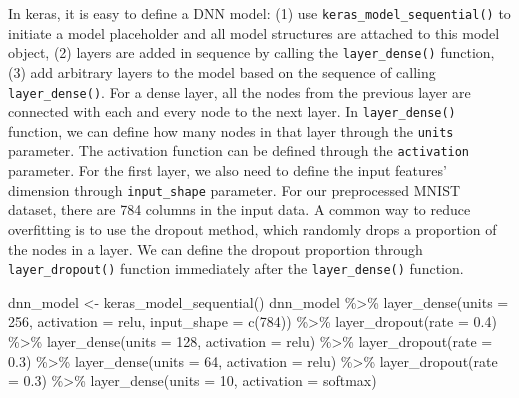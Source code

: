 \documentclass[
  12pt,
]{krantz}
\makeatletter
\newenvironment{Shaded}{\begin{snugshade}}{\end{snugshade}}
\newcommand{\AttributeTok}[1]{\textcolor[rgb]{0.61,0.61,0.61}{#1}}
\newcommand{\DecValTok}[1]{\textcolor[rgb]{0.06,0.06,0.06}{#1}}
\newcommand{\FloatTok}[1]{\textcolor[rgb]{0.06,0.06,0.06}{#1}}
\newcommand{\FunctionTok}[1]{\textcolor[rgb]{0,0,0}{#1}}
\newcommand{\NormalTok}[1]{#1}
\newcommand{\OtherTok}[1]{\textcolor[rgb]{0.37,0.37,0.37}{#1}}
\newcommand{\SpecialCharTok}[1]{\textcolor[rgb]{0,0,0}{#1}}
\newcommand{\StringTok}[1]{\textcolor[rgb]{0.5,0.5,0.5}{#1}}
\newenvironment{kframe}{%
\medskip{}
\setlength{\fboxsep}{.8em}
 \def\at@end@of@kframe{}%
 \ifinner\ifhmode%
  \def\at@end@of@kframe{\end{minipage}}%
  \begin{minipage}{\columnwidth}%
 \fi\fi%
 \def\FrameCommand##1{\hskip\@totalleftmargin \hskip-\fboxsep
 \colorbox{shadecolor}{##1}\hskip-\fboxsep
     \hskip-\linewidth \hskip-\@totalleftmargin \hskip\columnwidth}%
 \MakeFramed {\advance\hsize-\width
   \@totalleftmargin\z@ \linewidth\hsize
   \@setminipage}}%
 {\par\unskip\endMakeFramed%
 \at@end@of@kframe}
\renewenvironment{Shaded}{\begin{kframe}}{\end{kframe}}
\makeatother
\begin{document}
In keras, it is easy to define a DNN model: (1) use \texttt{keras\_model\_sequential()} to initiate a model placeholder and all model structures are attached to this model object, (2) layers are added in sequence by calling the \texttt{layer\_dense()} function, (3) add arbitrary layers to the model based on the sequence of calling \texttt{layer\_dense()}. For a dense layer, all the nodes from the previous layer are connected with each and every node to the next layer. In \texttt{layer\_dense()} function, we can define how many nodes in that layer through the \texttt{units} parameter. The activation function can be defined through the \texttt{activation} parameter. For the first layer, we also need to define the input features' dimension through \texttt{input\_shape} parameter. For our preprocessed MNIST dataset, there are 784 columns in the input data. A common way to reduce overfitting is to use the dropout method, which randomly drops a proportion of the nodes in a layer. We can define the dropout proportion through \texttt{layer\_dropout()} function immediately after the \texttt{layer\_dense()} function.

\begin{Shaded}
\begin{Highlighting}[]
\NormalTok{dnn\_model }\OtherTok{\textless{}{-}} \FunctionTok{keras\_model\_sequential}\NormalTok{()}
\NormalTok{dnn\_model }\SpecialCharTok{\%\textgreater{}\%}
  \FunctionTok{layer\_dense}\NormalTok{(}\AttributeTok{units =} \DecValTok{256}\NormalTok{, }\AttributeTok{activation =} \StringTok{\textquotesingle{}relu\textquotesingle{}}\NormalTok{, }\AttributeTok{input\_shape =} \FunctionTok{c}\NormalTok{(}\DecValTok{784}\NormalTok{)) }\SpecialCharTok{\%\textgreater{}\%}
  \FunctionTok{layer\_dropout}\NormalTok{(}\AttributeTok{rate =} \FloatTok{0.4}\NormalTok{) }\SpecialCharTok{\%\textgreater{}\%}
  \FunctionTok{layer\_dense}\NormalTok{(}\AttributeTok{units =} \DecValTok{128}\NormalTok{, }\AttributeTok{activation =} \StringTok{\textquotesingle{}relu\textquotesingle{}}\NormalTok{) }\SpecialCharTok{\%\textgreater{}\%}
  \FunctionTok{layer\_dropout}\NormalTok{(}\AttributeTok{rate =} \FloatTok{0.3}\NormalTok{) }\SpecialCharTok{\%\textgreater{}\%}
  \FunctionTok{layer\_dense}\NormalTok{(}\AttributeTok{units =} \DecValTok{64}\NormalTok{, }\AttributeTok{activation =} \StringTok{\textquotesingle{}relu\textquotesingle{}}\NormalTok{) }\SpecialCharTok{\%\textgreater{}\%}
  \FunctionTok{layer\_dropout}\NormalTok{(}\AttributeTok{rate =} \FloatTok{0.3}\NormalTok{) }\SpecialCharTok{\%\textgreater{}\%}
  \FunctionTok{layer\_dense}\NormalTok{(}\AttributeTok{units =} \DecValTok{10}\NormalTok{, }\AttributeTok{activation =} \StringTok{\textquotesingle{}softmax\textquotesingle{}}\NormalTok{)}
\end{Highlighting}
\end{Shaded}
\end{document}

